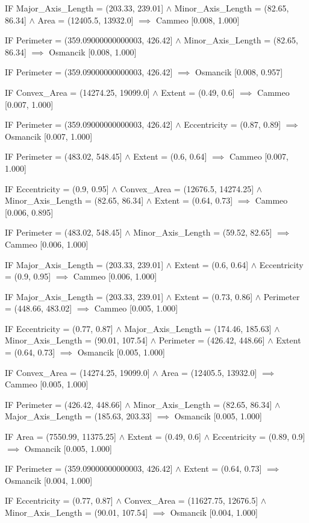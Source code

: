 IF Major\_Axis\_Length = (203.33, 239.01] $\land$ Minor\_Axis\_Length = (82.65, 86.34] $\land$ Area = (12405.5, 13932.0] $\implies$ Cammeo [0.008, 1.000]

IF Perimeter = (359.09000000000003, 426.42] $\land$ Minor\_Axis\_Length = (82.65, 86.34] $\implies$ Osmancik [0.008, 1.000]

IF Perimeter = (359.09000000000003, 426.42] $\implies$ Osmancik [0.008, 0.957]

IF Convex\_Area = (14274.25, 19099.0] $\land$ Extent = (0.49, 0.6] $\implies$ Cammeo [0.007, 1.000]

IF Perimeter = (359.09000000000003, 426.42] $\land$ Eccentricity = (0.87, 0.89] $\implies$ Osmancik [0.007, 1.000]

IF Perimeter = (483.02, 548.45] $\land$ Extent = (0.6, 0.64] $\implies$ Cammeo [0.007, 1.000]

IF Eccentricity = (0.9, 0.95] $\land$ Convex\_Area = (12676.5, 14274.25] $\land$ Minor\_Axis\_Length = (82.65, 86.34] $\land$ Extent = (0.64, 0.73] $\implies$ Cammeo [0.006, 0.895]

IF Perimeter = (483.02, 548.45] $\land$ Minor\_Axis\_Length = (59.52, 82.65] $\implies$ Cammeo [0.006, 1.000]

IF Major\_Axis\_Length = (203.33, 239.01] $\land$ Extent = (0.6, 0.64] $\land$ Eccentricity = (0.9, 0.95] $\implies$ Cammeo [0.006, 1.000]

IF Major\_Axis\_Length = (203.33, 239.01] $\land$ Extent = (0.73, 0.86] $\land$ Perimeter = (448.66, 483.02] $\implies$ Cammeo [0.005, 1.000]

IF Eccentricity = (0.77, 0.87] $\land$ Major\_Axis\_Length = (174.46, 185.63] $\land$ Minor\_Axis\_Length = (90.01, 107.54] $\land$ Perimeter = (426.42, 448.66] $\land$ Extent = (0.64, 0.73] $\implies$ Osmancik [0.005, 1.000]

IF Convex\_Area = (14274.25, 19099.0] $\land$ Area = (12405.5, 13932.0] $\implies$ Cammeo [0.005, 1.000]

IF Perimeter = (426.42, 448.66] $\land$ Minor\_Axis\_Length = (82.65, 86.34] $\land$ Major\_Axis\_Length = (185.63, 203.33] $\implies$ Osmancik [0.005, 1.000]

IF Area = (7550.99, 11375.25] $\land$ Extent = (0.49, 0.6] $\land$ Eccentricity = (0.89, 0.9] $\implies$ Osmancik [0.005, 1.000]

IF Perimeter = (359.09000000000003, 426.42] $\land$ Extent = (0.64, 0.73] $\implies$ Osmancik [0.004, 1.000]

IF Eccentricity = (0.77, 0.87] $\land$ Convex\_Area = (11627.75, 12676.5] $\land$ Minor\_Axis\_Length = (90.01, 107.54] $\implies$ Osmancik [0.004, 1.000]

